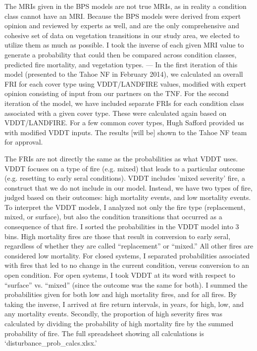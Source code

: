 The MRIs given in the BPS models are not true MRIs, as in reality a condition class cannot have an MRI. Because the BPS models were derived from expert opinion and reviewed by experts as well, and are the only comprehensive and cohesive set of data on vegetation transitions in our study area, we elected to utilize them as much as possible. I took the inverse of each given MRI value to generate a probability that could then be compared across condition classes, predicted fire mortality, and vegetation types.
---
In the first iteration of this model (presented to the Tahoe NF in February 2014), we calculated an overall FRI for each cover type using VDDT/LANDFIRE values, modified with expert opinion consisting of input from our partners on the TNF. For the second iteration of the model, we have included separate FRIs for each condition class associated with a given cover type. These were calculated again based on VDDT/LANDFIRE. For a few common cover types, Hugh Safford provided us with modified VDDT inputs. The results [will be] shown to the Tahoe NF team for approval.

The FRIs are not directly the same as the probabilities as what VDDT uses. VDDT focuses on a type of fire (e.g. mixed) that leads to a particular outcome (e.g. resetting to early seral conditions). VDDT includes 'mixed severity' fire, a construct that we do not include in our model. Instead, we have two types of fire, judged based on their outcomes: high mortality events, and low mortality events. To interpret the VDDT models, I analyzed not only the fire type (replacement, mixed, or surface), but also the condition transitions that occurred as a consequence of that fire. I sorted the probabilities in the VDDT model into 3 bins. High mortality fires are those that result in conversion to early seral, regardless of whether they are called ``replacement'' or ``mixed.'' All other fires are considered low mortality. For closed systems, I separated probabilities associated with fires that led to no change in the current condition, versus conversion to an open condition. For open systems, I took VDDT at its word with respect to ``surface'' vs. ``mixed'' (since the outcome was the same for both). I summed the probabilities given for both low and high mortality fires, and for all fires. By taking the inverse, I arrived at fire return intervals, in years, for high, low, and any mortality events. Secondly, the proportion of high severity fires was calculated by dividing the probability of high mortality fire by the summed probability of fire. The full spreadsheet showing all calculations is `disturbance_prob_calcs.xlsx.'